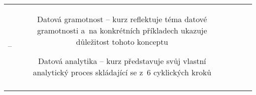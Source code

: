 \begin{landscape}
\begin{table}[htbp]
{\begin{tabularx}{\linewidth}{CCCCC}
–

&

Datová gramotnost – kurz reflektuje téma datové gramotnosti a~na konkrétních příkladech ukazuje důležitost tohoto konceptu

Datová analytika – kurz představuje svůj vlastní analytický proces skládající se z~6 cyklických kroků

\\

\tabularnewline
\bottomrule
\end{tabularx}

}

\end{table}

\end{landscape}